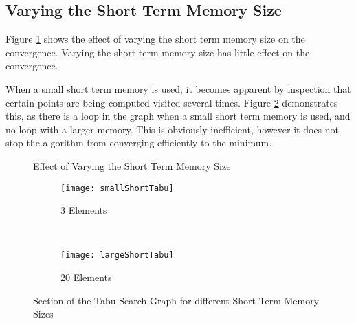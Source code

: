 \documentclass[a4paper,12pt]{article}
\begin{document}
\subsection{Varying the Short Term Memory Size}

Figure \ref{fig:tabuShort} shows the effect of varying the short term memory size on the convergence. 
Varying the short term memory size has little effect on the convergence.

When a small short term memory is used, it becomes apparent by inspection that certain points are being computed visited several times.
Figure \ref{fig:shortComparison} demonstrates this, as there is a loop in the graph when a small short term memory is used, and no loop with a larger memory.
This is obviously inefficient, however it does not stop the algorithm from converging efficiently to the minimum. 



\begin{figure}[H]
\centering
{}
\caption{Effect of Varying the Short Term Memory Size}
\label{fig:tabuShort}
\end{figure}

\begin{figure}[H]
    \centering
    \begin{subfigure}[b]{0.3\textwidth}
        \centering
        \texttt{[image: smallShortTabu]}
        \caption{3 Elements}
    \end{subfigure}%
    ~ 
    \begin{subfigure}[b]{0.3\textwidth}
        \centering
        \texttt{[image: largeShortTabu]}
        \caption{20 Elements}
    \end{subfigure}
    \caption{Section of the Tabu Search Graph for different Short Term Memory Sizes}
    \label{fig:shortComparison}
\end{figure}
\end{document}
